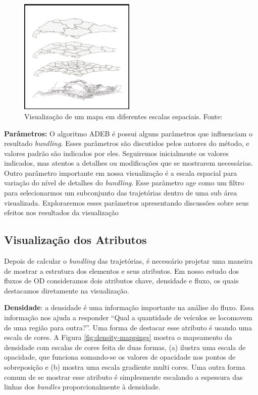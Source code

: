 \begin{figure}[!htb]
  \centering
  \includegraphics[width=55mm]{../figuras/multi-scale.png}
  \caption[Visualização de um mapa em diferentes escalas espaciais]{Visualização de um mapa em diferentes escalas espaciais. Fonte: \citet{Zeng2013}}
  \label{fig:multi-scale}
\end{figure}

\textbf{Parâmetros:} O algoritmo ADEB é possui alguns parâmetros que
influenciam o resultado \emph{bundling}. Esses parâmetros são discutidos pelos
autores do método, e valores padrão são indicados por eles. Seguiremos
inicialmente os valores indicados, mas atentos a detalhes ou modificações que
se mostrarem necessárias. Outro parâmetro importante em nossa visualização é a
escala espacial para variação do nível de detalhes do \emph{bundling}. Esse
parâmetro age como um filtro para selecionarmos um subconjunto das trajetórias
dentro de uma sub área visualizada. Exploraremos esses parâmetros apresentando
discussões sobre seus efeitos nos resultados da visualização

\subsection{Visualização dos Atributos}
Depois de calcular o \emph{bundling} das trajetórias, é necessário projetar uma
maneira de mostrar a estrutura dos elementos e seus atributos. Em nosso estudo
dos fluxos de OD consideramos dois atributos chave, densidade e fluxo, os quais
destacamos diretamente na visualização.

\textbf{Densidade}: a densidade é uma informação importante na análise do
fluxo. Essa informação nos ajuda a responder ``Qual a quantidade de veículos se
locomovem de uma região para outra?''. Uma forma de destacar esse atributo é
usando uma escala de cores. A Figura \ref{fig:density-mappings} mostra o
mapeamento da densidade com escalas de cores feita de duas formas, (a) ilustra
uma escala de opacidade, que funciona somando-se os valores de opacidade nos
pontos de sobreposição e (b) mostra uma escala gradiente multi cores. Uma outra
forma comum de se mostrar esse atributo é simplesmente escalando a espessura
das linhas dos \emph{bundles} proporcionalmente à densidade.

